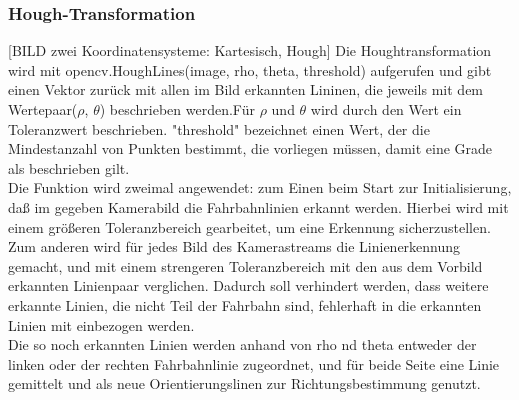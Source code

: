\subsubsection{Hough-Transformation}
[BILD zwei Koordinatensysteme: Kartesisch, Hough]
Die Houghtransformation wird mit opencv.HoughLines(image, rho, theta, threshold) aufgerufen und gibt einen
Vektor zurück mit allen im Bild erkannten Lininen, die jeweils mit dem
Wertepaar($\rho$, $\theta$) beschrieben werden.Für $\rho$ und $\theta$ wird durch den Wert
ein Toleranzwert beschrieben. "threshold" bezeichnet einen Wert, der
die Mindestanzahl von Punkten bestimmt, die vorliegen müssen, damit eine Grade
als beschrieben gilt.\\
Die Funktion wird zweimal angewendet: zum Einen beim Start zur Initialisierung,
daß im gegeben Kamerabild die Fahrbahnlinien erkannt werden. Hierbei wird mit
einem größeren Toleranzbereich gearbeitet, um eine Erkennung sicherzustellen.
Zum anderen wird für jedes Bild des Kamerastreams die Linienerkennung gemacht,
und mit einem strengeren Toleranzbereich mit den aus dem Vorbild erkannten
Linienpaar verglichen. Dadurch soll verhindert werden, dass weitere erkannte
Linien, die nicht Teil der Fahrbahn sind, fehlerhaft in die erkannten Linien mit
einbezogen werden.\\
Die so noch erkannten Linien werden anhand von rho nd theta  entweder der linken 
oder der rechten Fahrbahnlinie zugeordnet, und für beide Seite eine Linie
gemittelt und als neue Orientierungslinen zur Richtungsbestimmung genutzt.\\
